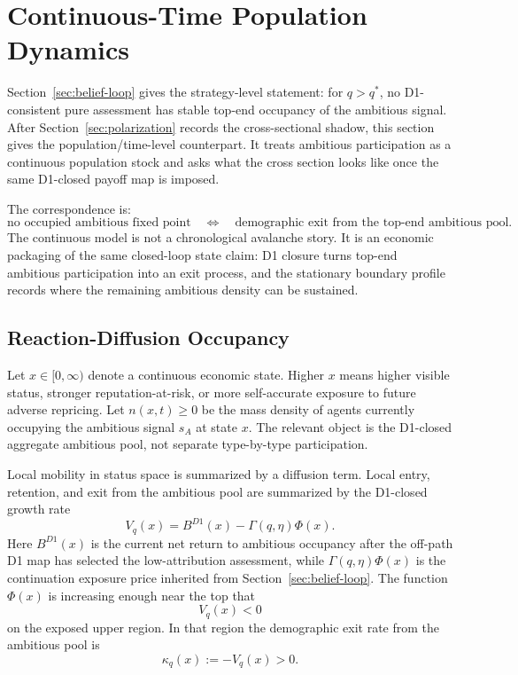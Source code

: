 
\section{Continuous-Time Population Dynamics}
\label{sec:continuous-population}

Section~\ref{sec:belief-loop} gives the strategy-level statement: for \(q>q^*\), no D1-consistent pure assessment has stable top-end occupancy of the ambitious signal. After Section~\ref{sec:polarization} records the cross-sectional shadow, this section gives the population/time-level counterpart. It treats ambitious participation as a continuous population stock and asks what the cross section looks like once the same D1-closed payoff map is imposed.

The correspondence is:
\[
\text{no occupied ambitious fixed point}
\quad\Longleftrightarrow\quad
\text{demographic exit from the top-end ambitious pool}.
\]
The continuous model is not a chronological avalanche story. It is an economic packaging of the same closed-loop state claim: D1 closure turns top-end ambitious participation into an exit process, and the stationary boundary profile records where the remaining ambitious density can be sustained.

\subsection{Reaction-Diffusion Occupancy}

Let \(x\in[0,\infty)\) denote a continuous economic state. Higher \(x\) means higher visible status, stronger reputation-at-risk, or more self-accurate exposure to future adverse repricing. Let \(n(x,t)\ge0\) be the mass density of agents currently occupying the ambitious signal \(s_A\) at state \(x\). The relevant object is the D1-closed aggregate ambitious pool, not separate type-by-type participation.

Local mobility in status space is summarized by a diffusion term. Local entry, retention, and exit from the ambitious pool are summarized by the D1-closed growth rate
\[
V_q(x)=B^{D1}(x)-\Gamma(q,\eta)\Phi(x).
\]
Here \(B^{D1}(x)\) is the current net return to ambitious occupancy after the off-path D1 map has selected the low-attribution assessment, while \(\Gamma(q,\eta)\Phi(x)\) is the continuation exposure price inherited from Section~\ref{sec:belief-loop}. The function \(\Phi(x)\) is increasing enough near the top that
\[
V_q(x)<0
\]
on the exposed upper region. In that region the demographic exit rate from the ambitious pool is
\[
\kappa_q(x):=-V_q(x)>0.
\]


